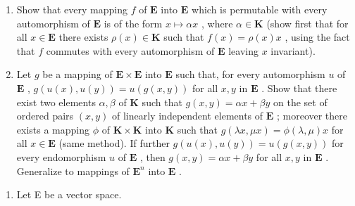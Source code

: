 \begin{enumerate}
\def\labelenumi{(\alph{enumi})}
\item
  Show that every mapping \(f\) of \(\mathbf{E}\) into \(\mathbf{E}\) which is permutable with every automorphism of \(\mathbf{E}\) is of the form \(x \mapsto \alpha x\) , where \(\alpha \in \mathbf{K}\) (show first that for all \(x \in \mathbf{E}\) there exists \(\rho(x) \in \mathbf{K}\) such that \(f(x) = \rho(x)x\) , using the fact that \(f\) commutes with every automorphism of \(\mathbf{E}\) leaving \(x\) invariant).
\item
  Let \(g\) be a mapping of \(\mathbf{E} \times \mathbf{E}\) into \(\mathbf{E}\) such that, for every automorphism \(u\) of \(\mathbf{E}\) , \(g(u(x), u(y)) = u(g(x, y))\) for all \(x, y\) in \(\mathbf{E}\) . Show that there exist two elements \(\alpha, \beta\) of \(\mathbf{K}\) such that \(g(x, y) = \alpha x + \beta y\) on the set of ordered pairs \((x, y)\) of linearly independent elements of \(\mathbf{E}\) ; moreover there exists a mapping \(\phi\) of \(\mathbf{K} \times \mathbf{K}\) into \(\mathbf{K}\) such that \(g(\lambda x, \mu x) = \phi(\lambda, \mu)x\) for all \(x \in \mathbf{E}\) (same method). If further \(g(u(x), u(y)) = u(g(x, y))\) for every endomorphism \(u\) of \(\mathbf{E}\) , then \(g(x, y) = \alpha x + \beta y\) for all \(x, y\) in \(\mathbf{E}\) . Generalize to mappings of \(\mathbf{E}^n\) into \(\mathbf{E}\) .
\end{enumerate}

\begin{enumerate}
\def\labelenumi{\arabic{enumi}.}
\setcounter{enumi}{19}
\tightlist
\item
  Let E be a vector space.
\end{enumerate}

